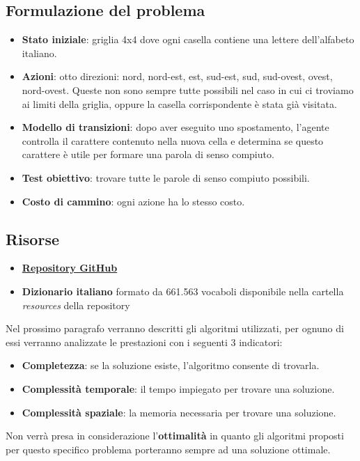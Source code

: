 \documentclass[10pt,a4paper]{article}
\begin{document}
	\subsection{Formulazione del problema}
	\begin{itemize}
		\item \textbf{Stato iniziale}: griglia 4x4 dove ogni casella contiene una lettere dell'alfabeto italiano.
		\item \textbf{Azioni}: otto direzioni: nord, nord-est, est, sud-est, sud, sud-ovest, ovest, nord-ovest. Queste non sono sempre tutte possibili nel caso in cui ci troviamo ai limiti della griglia, oppure la casella corrispondente è stata già visitata.
		\item \textbf{Modello di transizioni}: dopo aver eseguito uno spostamento, l'agente controlla il carattere contenuto nella nuova cella e determina se questo carattere è utile per formare una parola di senso compiuto.
		\item \textbf{Test obiettivo}: trovare tutte le parole di senso compiuto possibili.
		\item\textbf{Costo di cammino}: ogni azione ha lo stesso costo.
	\end{itemize}
	\subsection{Risorse}
	\begin{itemize}
		\item \href{https://github.com/RazzoloDevs/Razzolo}{\textbf{Repository GitHub}}
		\item \textbf{Dizionario italiano} formato da 661.563 vocaboli disponibile nella cartella \textit{resources} della repository
	\end{itemize}
	Nel prossimo paragrafo verranno descritti gli algoritmi utilizzati, per ognuno di essi verranno analizzate le prestazioni con i seguenti 3 indicatori:
	\begin{itemize}
		\item \textbf{Completezza}: se la soluzione esiste, l'algoritmo consente di trovarla.
		\item \textbf{Complessità temporale}: il tempo impiegato per trovare una soluzione.
		\item \textbf{Complessità spaziale}: la memoria necessaria per trovare una soluzione.
	\end{itemize}
	Non verrà presa in considerazione l'\textbf{ottimalità} in quanto gli algoritmi proposti per questo specifico problema porteranno sempre ad una soluzione ottimale.
	\newpage
\end{document}
